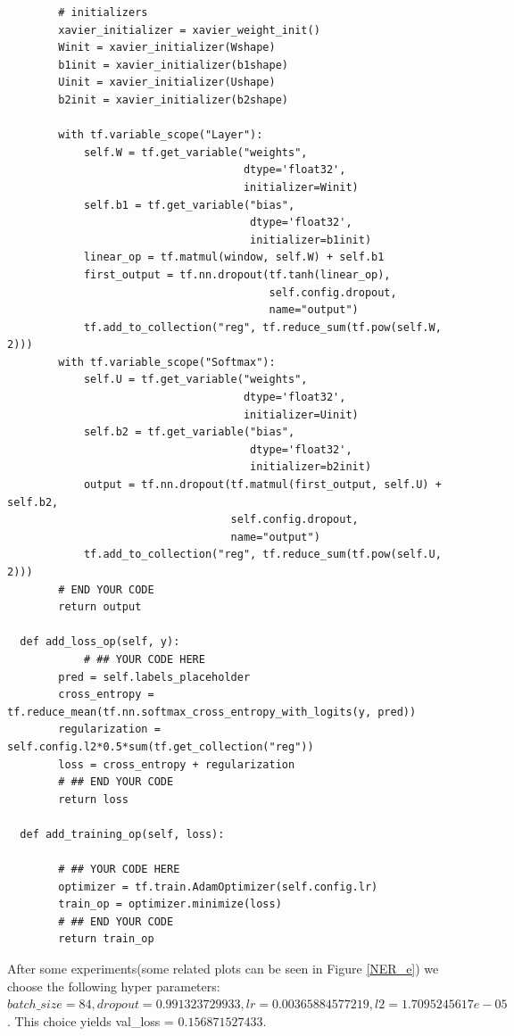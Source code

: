 \documentclass{article}
\begin{document}
\begin{verbatim}
        # initializers
        xavier_initializer = xavier_weight_init()
        Winit = xavier_initializer(Wshape)
        b1init = xavier_initializer(b1shape)
        Uinit = xavier_initializer(Ushape)
        b2init = xavier_initializer(b2shape)

        with tf.variable_scope("Layer"):
            self.W = tf.get_variable("weights",
                                     dtype='float32',
                                     initializer=Winit)
            self.b1 = tf.get_variable("bias",
                                      dtype='float32',
                                      initializer=b1init)
            linear_op = tf.matmul(window, self.W) + self.b1
            first_output = tf.nn.dropout(tf.tanh(linear_op),
                                         self.config.dropout,
                                         name="output")
            tf.add_to_collection("reg", tf.reduce_sum(tf.pow(self.W, 2)))
        with tf.variable_scope("Softmax"):
            self.U = tf.get_variable("weights",
                                     dtype='float32',
                                     initializer=Uinit)
            self.b2 = tf.get_variable("bias",
                                      dtype='float32',
                                      initializer=b2init)
            output = tf.nn.dropout(tf.matmul(first_output, self.U) + self.b2,
                                   self.config.dropout,
                                   name="output")
            tf.add_to_collection("reg", tf.reduce_sum(tf.pow(self.U, 2)))
        # END YOUR CODE
        return output
        
  def add_loss_op(self, y):
            # ## YOUR CODE HERE
        pred = self.labels_placeholder
        cross_entropy = tf.reduce_mean(tf.nn.softmax_cross_entropy_with_logits(y, pred))
        regularization = self.config.l2*0.5*sum(tf.get_collection("reg"))
        loss = cross_entropy + regularization
        # ## END YOUR CODE
        return loss
        
  def add_training_op(self, loss):
     
        # ## YOUR CODE HERE
        optimizer = tf.train.AdamOptimizer(self.config.lr)
        train_op = optimizer.minimize(loss)
        # ## END YOUR CODE
        return train_op
\end{verbatim}

After some experiments(some related plots can be seen in Figure \ref{NER_e}) we choose the following hyper parameters: $ batch\_size=84, dropout=0.991323729933, lr=0.00365884577219, l2=1.7095245617e-05$. This choice yields val\_loss = $0.156871527433$.
\end{document}
